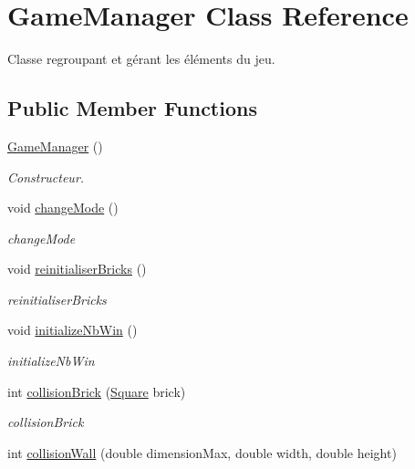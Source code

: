 \hypertarget{class_game_manager}{}\section{Game\+Manager Class Reference}
\label{class_game_manager}


Classe regroupant et gérant les éléments du jeu.  


\subsection*{Public Member Functions}
\begin{DoxyCompactItemize}
\item 
\mbox{\hyperlink{class_game_manager_aa0e2424dc1a39d380e5b6605b179bf05}{Game\+Manager}} ()
\begin{DoxyCompactList}\small\item\em Constructeur. \end{DoxyCompactList}\item 
void \mbox{\hyperlink{class_game_manager_a707019231d8892afbe87da17dc31ae9e}{change\+Mode}} ()
\begin{DoxyCompactList}\small\item\em change\+Mode \end{DoxyCompactList}\item 
void \mbox{\hyperlink{class_game_manager_a982951601283ec375c115cd3f19b64a2}{reinitialiser\+Bricks}} ()
\begin{DoxyCompactList}\small\item\em reinitialiser\+Bricks \end{DoxyCompactList}\item 
void \mbox{\hyperlink{class_game_manager_aec56f391111fb15f43711719da20e407}{initialize\+Nb\+Win}} ()
\begin{DoxyCompactList}\small\item\em initialize\+Nb\+Win \end{DoxyCompactList}\item 
int \mbox{\hyperlink{class_game_manager_a2bd2b0363ac1c5c6026029fba4d41e38}{collision\+Brick}} (\mbox{\hyperlink{class_square}{Square}} brick)
\begin{DoxyCompactList}\small\item\em collision\+Brick \end{DoxyCompactList}\item 
int \mbox{\hyperlink{class_game_manager_aaab1c8649edbdc0496371a83bad05cb4}{collision\+Wall}} (double dimension\+Max, double width, double height)

\end{DoxyCompactItemize}

